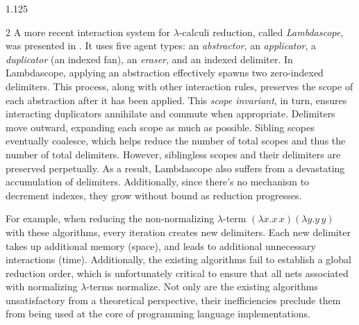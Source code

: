\documentclass[10pt]{article}
\begin{document}
\begin{spacing}{1.125}
\begin{multicols}{2}
A more recent interaction system for \mbox{$\lambda$-calculi} reduction, called \textit{Lambdascope}, was presented in \cite{OL04}. It uses five agent types: an \textit{abstractor}, an \textit{applicator}, a \textit{duplicator} (an indexed fan), an \textit{eraser}, and an indexed delimiter. In Lambdascope, applying an abstraction effectively spawns two zero-indexed delimiters. This process, along with other interaction rules, preserves the scope of each abstraction after it has been applied. This \textit{scope invariant}, in turn, ensures interacting duplicators annihilate and commute when appropriate. Delimiters move outward, expanding each scope as much as possible. Sibling scopes eventually coalesce, which helps reduce the number of total scopes and thus the number of total delimiters. However, siblingless scopes and their delimiters are preserved perpetually. As a result, Lambdascope also suffers from a devastating accumulation of delimiters. Additionally, since there's no mechanism to decrement indexes, they grow without bound as reduction progresses.

For example, when reducing the non-normalizing $\lambda$-term $(\lambda x.x\,x)(\lambda y.y\,y)$ with these algorithms, every iteration creates new delimiters. Each new delimiter takes up additional memory (space), and leads to additional unnecessary interactions (time).
Additionally, the existing algorithms fail to establish a global reduction order, which is unfortunately critical to ensure that all nets associated with normalizing \mbox{$\lambda$-terms} normalize.
Not only are the existing algorithms unsatisfactory from a theoretical perspective, their inefficiencies preclude them from being used at the core of programming language implementations.


\end{multicols}
\end{spacing}
\end{document}
